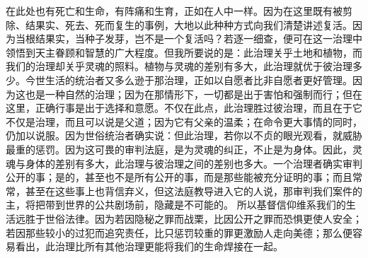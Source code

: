 在此处也有死亡和生命，有阵痛和生育，正如在人中一样。因为在这里既有被剪除、结果实、死去、死而复生的事例，大地以此种种方式向我们清楚讲述复活。因为当根结果实，当种子发芽，岂不是一个复活吗？若逐一细查，便可在这一治理中领悟到天主眷顾和智慧的广大程度。但我所要说的是：此治理关乎土地和植物，而我们的治理却关乎灵魂的照料。植物与灵魂的差别有多大，此治理就优于彼治理多少。今世生活的统治者又多么逊于那治理，正如以自愿者比非自愿者更好管理。因为这也是一种自然的治理；因为在那情形下，一切都是出于害怕和强制而行；但在这里，正确行事是出于选择和意愿。不仅在此点，此治理胜过彼治理，而且在于它不仅是治理，而且可以说是父道；因为它有父亲的温柔；在命令更大事情的同时，仍加以说服。因为世俗统治者确实说：但此治理，若你以不贞的眼光观看，就威胁最重的惩罚。因为这可畏的审判法庭，是为灵魂的纠正，不止是为身体。因此，灵魂与身体的差别有多大，此治理与彼治理之间的差别也多大。一个治理者确实审判公开的事；是的，甚至也不是所有公开的事，而是那些能被充分证明的事；而且常常，甚至在这些事上也背信弃义，但这法庭教导进入它的人说，那审判我们案件的主，将把带到世界的公共剧场前，隐藏是不可能的。 所以基督信仰维系我们的生活远胜于世俗法律。因为若因隐秘之罪而战栗，比因公开之罪而恐惧更使人安全；若因那些较小的过犯而追究责任，比只惩罚较重的罪更激励人走向美德；那么便容易看出，此治理比所有其他治理更能将我们的生命焊接在一起。\par

